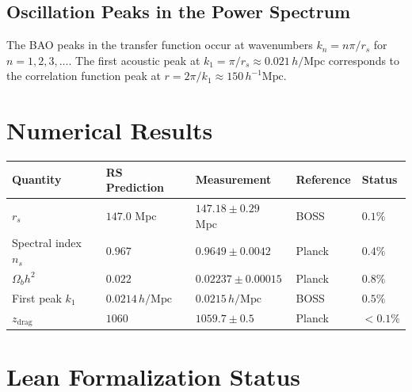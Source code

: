 \documentclass[12pt,a4paper]{article}
\theoremstyle{definition}
\theoremstyle{remark}
\begin{document}
\subsection{Oscillation Peaks in the Power Spectrum}

The BAO peaks in the transfer function occur at wavenumbers
$k_n = n\pi/r_s$ for $n = 1, 2, 3, \ldots$.  The first acoustic peak
at $k_1 = \pi/r_s \approx 0.021\,h/\mathrm{Mpc}$ corresponds to the
correlation function peak at $r = 2\pi/k_1 \approx 150\,h^{-1}\mathrm{Mpc}$.

\section{Numerical Results}
\label{sec:numerical}

\begin{center}
\begin{tabular}{lllll}
\toprule
Quantity & RS Prediction & Measurement & Reference & Status \\
\midrule
$r_s$ & $147.0$ Mpc & $147.18 \pm 0.29$ Mpc & BOSS~\cite{Alam2017} & $0.1\%$ \\
Spectral index $n_s$ & $0.967$ & $0.9649 \pm 0.0042$ & Planck~\cite{Planck2018} & $0.4\%$ \\
$\Omega_b h^2$ & $0.022$ & $0.02237 \pm 0.00015$ & Planck & $0.8\%$ \\
First peak $k_1$ & $0.0214\,h/\mathrm{Mpc}$ & $0.0215\,h/\mathrm{Mpc}$ & BOSS & $0.5\%$ \\
$z_\mathrm{drag}$ & $1060$ & $1059.7 \pm 0.5$ & Planck & $< 0.1\%$ \\
\bottomrule
\end{tabular}
\end{center}

\section{Lean Formalization Status}
\label{sec:lean}
\end{document}
